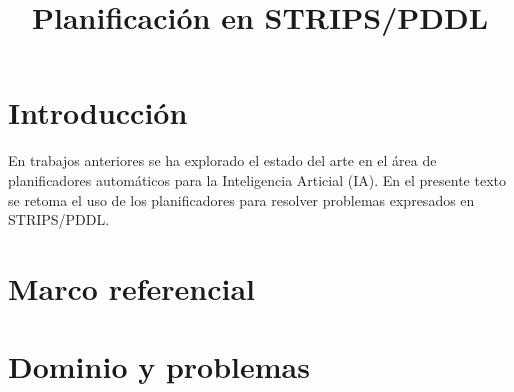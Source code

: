 \documentclass[a4paper,12pt]{article}
\title{Planificación en STRIPS/PDDL}
\makeatletter
\let\newtitle\@title
\makeatother
\begin{document}
\textcolor{UnirDark}{\LARGE\bfseries\newtitle}

\section{Introducción}

En trabajos anteriores se ha explorado el estado del arte en el área de planificadores automáticos para la Inteligencia Articial (IA). En el presente texto se retoma el uso de los planificadores para resolver problemas expresados en STRIPS/PDDL.

\section{Marco referencial}

\section{Dominio y problemas}
\end{document}

